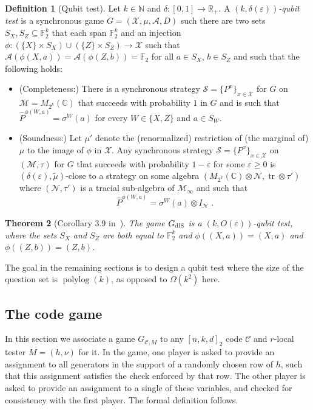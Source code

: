 \documentclass[11pt]{article}
\newtheorem{theorem}{Theorem}[section]
\theoremstyle{definition}
\newtheorem{definition}[theorem]{Definition}
\newcommand{\code}{\mathscr{C}}
\newcommand{\strategy}{\mathscr{S}}
\newcommand{\Id}{\ensuremath{I}}
\newcommand{\field}{\mathbb{F}_2}
\newcommand{\C}{\ensuremath{\mathbb{C}}}
\newcommand{\N}{\ensuremath{\mathbb{N}}}
\newcommand{\dlS}{\ensuremath{\rm dlS}}
\newcommand{\F}{\ensuremath{\mathbb{F}}}
\newcommand{\R}{\ensuremath{\mathbb{R}}}
\newcommand{\mA}{\ensuremath{\mathcal{A}}}
\newcommand{\mM}{\ensuremath{\mathcal{M}}}
\newcommand{\mX}{\ensuremath{\mathcal{X}}}
\newcommand{\eps}{\varepsilon}
\newcommand{\mN}{\mathcal{N}}
\DeclareMathOperator{\polylog}{polylog}
\DeclareMathOperator{\tr}{tr}
\begin{document}
\begin{definition}[Qubit test]
Let $k\in \N$ and $\delta:[0,1]\to\R_+$. 
A \emph{$(k,\delta(\eps))$-qubit test} is a synchronous game $G=(\mX,\mu,\mA,D)$ such there are two sets $S_X,S_Z\subseteq \field^k$ that each span $\field^k$ and an injection $\phi:(\{X\}\times S_X) \cup (\{Z\}\times S_Z) \to \mX$ such that $\mA(\phi({X},a))=\mA(\phi({Z},b))=\field$ for all $a\in S_X$, $b\in S_Z$ and such that the following holds:
\begin{itemize}
\item (Completeness:) There is a synchronous strategy $\strategy = \{P^{x}\}_{x \in \mX}$ for $G$ on $\mM=M_{2^{k}}(\C)$ that succeeds with probability $1$ in $G$ and is such that $\widehat{P}^{\phi({W},a)} = \sigma^W(a)$ for every $W\in\{X,Z\}$ and $a\in S_W$. 
\item (Soundness:) Let $\mu'$ denote the (renormalized) restriction of (the marginal of) $\mu$ to the image of $\phi$ in $\mX$.
Any synchronous strategy  $\strategy = \{P^{x}\}_{x \in \mX}$ on $(\mM,\tau)$ for $G$ that succeeds with probability $1-\eps$ for some $\eps\geq 0$ is $(\delta(\eps),\tilde{\mu})$-close to a strategy on some algebra $(M_{2^{k}}(\C)\otimes \mN,\tr\otimes \tau')$ where $(\mN,\tau')$ is a tracial sub-algebra of $\mM_\infty$ and such that
\[\widehat{P}^{\phi({W},a)} = \sigma^W(a)\otimes \Id_\mN\;.\]
\end{itemize}
\end{definition}

\begin{theorem}[Corollary 3.9 in~\cite{de2022spectral}]\label{thm:dls-braid}
The game $G_{\dlS}$ is a $(k,O(\eps))$-qubit test, where the sets $S_X$ and $S_Z$ are both equal to $\F_2^k$ and $\phi((X,a))=(X,a)$ and $\phi((Z,b))=(Z,b)$.  
\end{theorem}

The goal in the remaining sections is to design a qubit test where the size of the question set is $\polylog(k)$, as opposed to $\Omega(k^2)$ here. 

\subsection{The code game}
\label{sec:code-game}

In this section we associate a game $G_{\code,M}$ to any $[n,k,d]_2$ code $\code$ and $r$-local tester $M=(h,\nu)$ for it. In the game, one player is asked to provide an assignment to all generators in the support of a randomly chosen row of $h$, such that this assignment satisfies the check enforced by that row. The other player is asked to provide an assignment to a single of these variables, and checked for consistency with the first player. The formal definition follows.  
\end{document}
